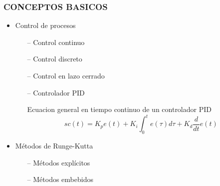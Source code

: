 \documentclass[usenames,dvipsnames]{beamer}
\begin{document}
\begin{frame}
	\frametitle{CONCEPTOS BASICOS}
	\vspace{20pt}

	\begin{itemize}
		\Large
		\setlength\itemsep{1em}
		\item Control de procesos
		\begin{itemize}
			\large
			\item[--] Control continuo
			\item[--] Control discreto
			\item[--] Control en lazo cerrado
			\item[--] Controlador PID
			\begin{block}{Ecuacion general en tiempo continuo de un controlador PID}
				\begin{equation}
					sc(t) = K_{p}e(t)+  K_{i}\int_{0}^{t} e(\tau) d\tau + K_{d} \frac{d}{dt}e(t)
				\end{equation}
			\end{block}
		\end{itemize}
		\item Métodos de Runge-Kutta
		\begin{itemize}
			\large
			\item[--] Métodos explícitos
			\item[--] Métodos embebidos
		\end{itemize} 
	\end{itemize}
	
\end{frame}
\end{document}
